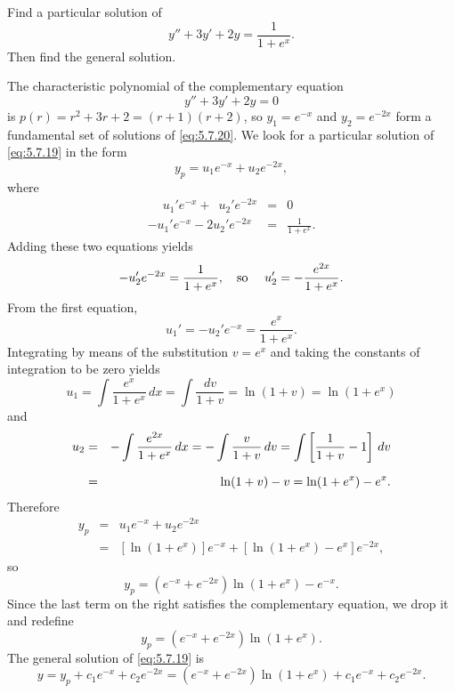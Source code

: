 \setcounter{example}{2}
\setcounter{equation}{18}
\begin{example}
  \label{example:5.7.3} \rm Find a particular solution of
  \begin{equation}
    \label{eq:5.7.19}y''+3y'+2y=\frac{1}{1+e^{x}}.
  \end{equation}
  Then find the general solution.
\end{example}
\setcounter{equation}{19}
\begin{examplesolution}
\solution

The characteristic polynomial of the complementary equation
\begin{equation}
  \label{eq:5.7.20}y''+3y'+2y=0
\end{equation}
is $p(r)=r^{2}+3r+2=(r+1)(r+2)$, so $y_{1}=e^{-x}$ and $y_{2}=e^{-2x}$ form a fundamental set of
solutions of \eqref{eq:5.7.20}. We look for a particular solution of \eqref{eq:5.7.19} in the form
\[
  y_{p}=u_{1}e^{-x}+u_{2}e^{-2x},
\]
where
\begin{eqnarray*}
  \phantom{-}u_{1}'e^{-x}+\phantom{2}u_{2}'e^{-2x} & = & 0 \\
  -u_{1}'e^{-x}-2u_{2}'e^{-2x}                     & = & \frac{1}{1+e^{x}}.
\end{eqnarray*}
Adding these two equations yields
\[
  -u_{2}'e^{-2x}=\frac{1}{1+e^{x}},\mbox{\quad so \quad}u_{2}'=-\frac{e^{2x}}{1+e^{x}}.
\]
From the first equation,
\[
  u_{1}'=-u_{2}'e^{-x}=\frac{e^{x}}{1+e^{x}}.
\]
Integrating by means of the substitution $v=e^{x}$ and taking the constants of integration to be
zero yields
\[
  u_{1}=\int\frac{e^{x}}{1+e^{x}}\,dx=\int\frac{dv}{1+v}=\ln(1+v)=\ln(1+e^{x})
\]
and
\begin{eqnarray*}
  u_{2} & = & -\int\frac{e^{2x}}{1+e^{x}}\,dx=-\int\frac{v}{1+v}\,dv=\int\left[\frac{1}{1+v}-1\right]\,dv \\[2\jot]
        & = & \ln(1+v)-v=\ln(1+e^{x})-e^{x}.
\end{eqnarray*}
Therefore
\begin{eqnarray*}
  y_{p} & = & u_{1}e^{-x}+u_{2}e^{-2x} \\
        & = & [\ln(1+e^{x})]e^{-x}+\left[\ln(1+e^{x})-e^{x}\right]e^{-2x},
\end{eqnarray*}
so
\[
  y_{p}=\left(e^{-x}+e^{-2x}\right)\ln(1+e^{x})-e^{-x}.
\]
Since the last term on the right satisfies the complementary equation, we drop it and redefine
\[
  y_{p}=\left(e^{-x}+e^{-2x}\right)\ln(1+e^{x}).
\]
The general solution of \eqref{eq:5.7.19} is
\[
  y=y_{p}+c_{1}e^{-x}+c_{2}e^{-2x}=\left(e^{-x}+e^{-2x}\right)\ln(1+e^{x}) +c_{1}e^{-x}+c_{2}e^{-2x}.
\]
\end{examplesolution}


